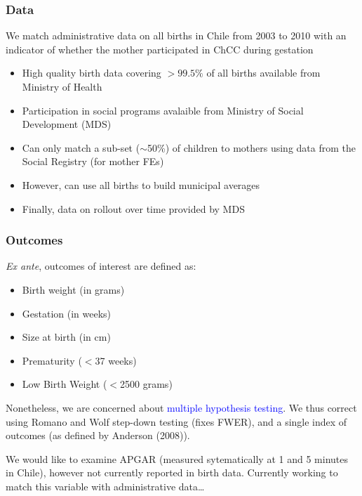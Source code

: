 \documentclass[10pt,letterpaper,subeqn,table]{beamer}
\begin{document}
\begin{frame}
\frametitle{Data}
We match administrative data on all births in Chile from 2003 to 2010 with an indicator of whether the mother participated in ChCC during gestation \vspace{3mm}
\begin{itemize}
\item High quality birth data covering $>99.5\%$ of all births available from Ministry of Health
\item Participation in social programs avalaible from Ministry of Social Development (MDS)
\item Can only match a sub-set ($\sim$50\%) of children to mothers using data from the Social Registry (for mother FEs)
\item However, can use all births to build municipal averages
\item Finally, data on rollout over time provided by MDS
\end{itemize}
\end{frame}

\begin{frame}
  \frametitle{Outcomes}
  \emph{Ex ante}, outcomes of interest are defined as:
  \begin{itemize}
  \item Birth weight (in grams)
  \item Gestation (in weeks)
  \item Size at birth (in cm)
  \item Prematurity ($<$37 weeks)
  \item Low Birth Weight ($<$2500 grams)
  \end{itemize}
  \vspace{4mm}
  Nonetheless, we are concerned about \textcolor{blue}{multiple hypothesis testing}.  We thus correct using Romano and Wolf step-down testing (fixes FWER), and a single index of outcomes (as defined by Anderson (2008)).
  \\ \vspace{4mm}
  
  We would like to examine APGAR (measured sytematically at 1 and 5 minutes in Chile), however not currently reported in birth data.  Currently working to match this variable with administrative data\ldots
\end{frame}
\end{document}
